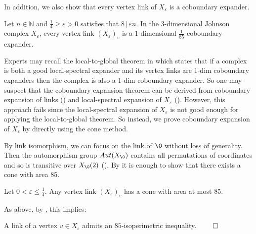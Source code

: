 In addition, we also show that every vertex link of $X_\varepsilon$ is a coboundary expander.
\begin{theorem}\label{thm:coboundary-Johnson-link}
    Let $n\in\mathbb{N}$ and $\frac{1}{4}\ge\varepsilon > 0$ satisfies that $8\,|\,\varepsilon n$. In the $3$-dimensional Johnson complex $X_{\varepsilon}$, every vertex link $(X_{\varepsilon})_v$ is a $1$-dimensional $\frac{1}{85}$-coboundary expander.
\end{theorem}
\begin{remark}
    Experts may recall the local-to-global theorem in \cite{EvraK2016} which states that if a complex is both a good local-spectral expander and its vertex links are $1$-dim coboundary expanders then the complex is also a $1$-dim coboundary expander. So one may suspect that the coboundary expansion theorem  can be derived from coboundary expansion of links () and local-spectral expansion of $X_\varepsilon$ (). However, this approach fails since the local-spectral expansion of $X_\varepsilon$ is not good enough for applying the local-to-global theorem. So instead, we prove coboundary expansion of $X_\varepsilon$ by directly using the cone method.
\end{remark}

By link isomorphism, we can focus on the link of $\0$ without loss of generality. Then the automorphism group $Aut(X_\0)$ contains all permutations of coordinates and so is transitive over  $X_\0(2)$ (). By  it is enough to show that there exists a cone with area $85$.
\begin{lemma} \label{lem:cone-for-link-X}
    Let \(0<\varepsilon \leq \frac{1}{4}\). Any vertex link \((X_{\varepsilon})_v\) has a cone with area at most \(85\).
\end{lemma}

As above, by , this implies:
\begin{corollary} \label{cor:isoperimetric-inequality-link}
    A link of a vertex \(v \in X_\varepsilon\) admits an \(85\)-isoperimetric inequality. \(\qed\)
\end{corollary}

%
